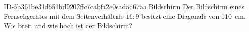 \begin{exercise}
      {ID-5b361be31d651bd9202ffc7cabfa2e0eadad67aa}
      {Bildschirm}
  \ifproblem\problem
    Der Bildschirm eines Fernsehgerätes mit dem
    Seitenverhältnis $16:9$ besitzt eine
    Diagonale von \SI{110}{\centi\metre}.
    Wie breit und wie hoch ist der Bildschirm?
  \fi
\end{exercise}
